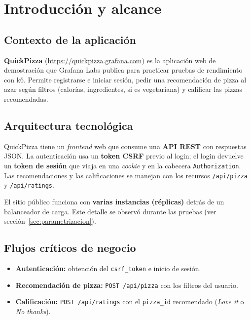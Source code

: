 \documentclass[11pt]{article}
\newcommand{\appURL}{https://quickpizza.grafana.com}
\begin{document}
\section{Introducción y alcance}

\subsection{Contexto de la aplicación}

\textbf{QuickPizza} (\url{\appURL}) es la aplicación web de demostración que
Grafana Labs publica para practicar pruebas de rendimiento con k6. Permite
registrarse e iniciar sesión, pedir una recomendación de pizza al azar según
filtros (calorías, ingredientes, si es vegetariana) y calificar las pizzas
recomendadas.

\subsection{Arquitectura tecnológica}

QuickPizza tiene un \emph{frontend} web que consume una \textbf{API REST} con
respuestas JSON. La autenticación usa un \textbf{token CSRF} previo al login; el
login devuelve un \textbf{token de sesión} que viaja en una \emph{cookie} y en la
cabecera \texttt{Authorization}. Las recomendaciones y las calificaciones se manejan
con los recursos \texttt{/api/pizza} y \texttt{/api/ratings}.

El sitio público funciona con \textbf{varias instancias (réplicas)} detrás de un
balanceador de carga. Este detalle se observó durante las pruebas (ver
sección~\ref{sec:parametrizacion}).

\subsection{Flujos críticos de negocio}

\begin{itemize}
  \item \textbf{Autenticación:} obtención del \texttt{csrf\_token} e inicio de sesión.
  \item \textbf{Recomendación de pizza:} \texttt{POST /api/pizza} con los filtros del usuario.
  \item \textbf{Calificación:} \texttt{POST /api/ratings} con el \texttt{pizza\_id} recomendado (\emph{Love it} o \emph{No thanks}).
\end{itemize}
\end{document}
